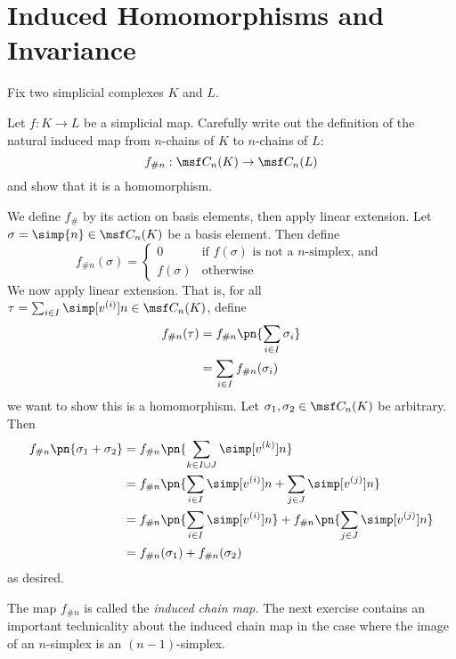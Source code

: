 \section{Induced Homomorphisms and Invariance}
Fix two simplicial complexes $K$ and $L$.
\begin{problem}[16.14]
  Let $f : K \to L$ be a simplicial map. Carefully write out the definition of
  the natural induced map from $n$-chains of $K$ to $n$-chains of $L$:
  \[
    f_{\# n} : \msf C_n(K) \to \msf C_n(L)
  \]
  and show that it is a homomorphism.
\end{problem}
\begin{solution}
  We define $f_\#$ by its action on basis elements, then apply linear extension.
  Let $\sigma = \simp{n} \in \msf C_n(K)$ be a basis element. Then define
  \[
    f_{\# n}(\sigma) =
    \begin{cases}
      0 & \text{if $f(\sigma)$ is not a $n$-simplex, and }\\
      f(\sigma) & \text{otherwise}
    \end{cases}
  \]
  We now apply linear extension. That is, for all $\tau = \sum_{i \in I}
  \simp[v^{(i)}]{n} \in \msf C_n(K)$, define
  \begin{align*}
    f_{\# n}(\tau)
    &= f_{\# n} \pn{\sum_{i\in I} \sigma_i} \\
    &= \sum_{i\in I} f_{\# n}(\sigma_i)
  \end{align*}
  we want to show this is a homomorphism. Let $\sigma_1, \sigma_2 \in \msf
  C_n(K)$ be arbitrary. Then
  \begin{align*}
    f_{\# n}\pn{\sigma_1 + \sigma_2}
    &= f_{\# n} \pn{\sum_{k\in I \cup J} \simp[v^{(k)}]{n}} \\
    &= f_{\# n} \pn{\sum_{i\in I} \simp[v^{(i)}]{n} + \sum_{j \in J} \simp[v^{(j)}]{n}} \\
    &= f_{\# n} \pn{\sum_{i\in I} \simp[v^{(i)}]{n}} + f_{\# n}\pn{\sum_{j \in J} \simp[v^{(j)}]{n}} \\
    &= f_{\# n}(\sigma_1) + f_{\# n}(\sigma_2)
  \end{align*}
  as desired.
\end{solution}
The map $f_{\# n}$ is called the \emph{induced chain map.} The next exercise
contains an important technicality about the induced chain map in the case where
the image of an $n$-simplex is an $(n-1)$-simplex.
